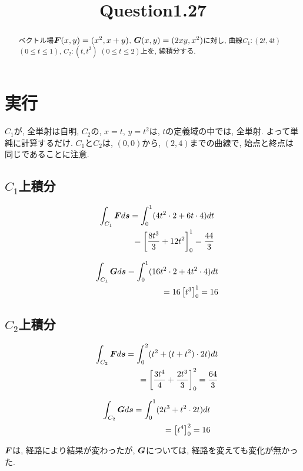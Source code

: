 \documentclass{jsarticle} \usepackage[dvipdfmx]{graphicx} \usepackage[dvipdfmx]{hyperref}
\title{Question1.27}
\newcommand*{\mbold}[1]{\mbox{\boldmath $#1$}}
\begin{document}
\maketitle

\begin{abstract}
  ベクトル場$\mbold{F}(x, y) = (x^2, x + y)$, $\mbold{G}(x, y) = (2xy, x^2)$に対し, 曲線$C_1:(2t, 4t)$ $(0\leq t \leq 1)$, $C_2:(t, t^2)$ $(0 \leq t \leq 2)$上を, 線積分する. 
\end{abstract}

\section*{実行}
$C_1$が, 全単射は自明, $C_2$の, $x = t$, $y = t^2$は, $t$の定義域の中では, 全単射. よって単純に計算するだけ. 
$C_1$と$C_2$は, $(0, 0)$から, $(2, 4)$までの曲線で, 始点と終点は同じであることに注意. 

\subsection*{$C_1$上積分}
\begin{eqnarray}
  && \int_{C_1} \mbold{F} d\mbold{s} = \int_0^1 (4t^2\cdot 2 + 6t\cdot 4)dt \nonumber \\
  && = \left[ \frac{8 t^3}{3} + 12 t^2 \right]_0^1 = \frac{44}{3}
\end{eqnarray}

\begin{eqnarray}
  && \int_{C_1} \mbold{G} d\mbold{s} = \int_0^1 (16t^2\cdot 2 + 4t^2\cdot 4)dt \nonumber \\
  && = 16 \left[ t^3 \right]_0^1 = 16
\end{eqnarray}

\subsection*{$C_2$上積分}
\begin{eqnarray}
  && \int_{C_2} \mbold{F} d\mbold{s} = \int_0^2 (t^2 + (t + t^2)\cdot 2t)dt \nonumber \\
  && = \left[ \frac{3 t^4}{4} + \frac{2 t^3}{3} \right]_0^2 = \frac{64}{3}
\end{eqnarray}

\begin{eqnarray}
  && \int_{C_2} \mbold{G} d\mbold{s} = \int_0^1 (2t^3 + t^2\cdot 2t)dt \nonumber \\
  && = \left[ t^4 \right]_0^2 = 16
\end{eqnarray}

$\mbold{F}$は, 経路により結果が変わったが, $\mbold{G}$については, 経路を変えても変化が無かった. 
\end{document}

